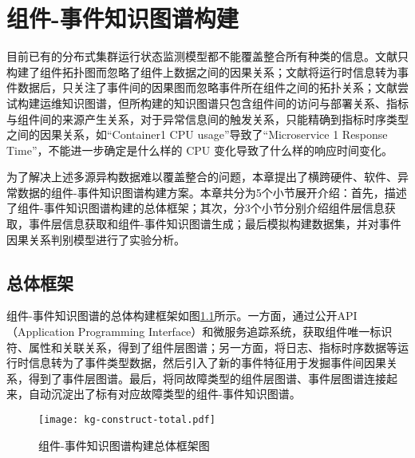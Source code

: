 \chapter{组件-事件知识图谱构建}
目前已有的分布式集群运行状态监测模型都不能覆盖整合所有种类的信息。文献\parencite{wang2019grano}只构建了组件拓扑图而忽略了组件上数据之间的因果关系；文献\parencite{nie2016mining-causality-graph}将运行时信息转为事件数据后，只关注了事件间的因果图而忽略事件所在组件之间的拓扑关系；文献\parencite{qiu2020causality-mining-knowledge-graph}尝试构建运维知识图谱，但所构建的知识图谱只包含组件间的访问与部署关系、指标与组件间的来源产生关系，对于异常信息间的触发关系，只能精确到指标时序类型之间的因果关系，如“Container1 CPU usage”导致了“Microservice 1 Response Time”，不能进一步确定是什么样的 CPU 变化导致了什么样的响应时间变化。

为了解决上述多源异构数据难以覆盖整合的问题，本章提出了横跨硬件、软件、异常数据的组件-事件知识图谱构建方案。本章共分为5个小节展开介绍：首先，描述了组件-事件知识图谱构建的总体框架；其次，分3个小节分别介绍组件层信息获取，事件层信息获取和组件-事件知识图谱生成；最后模拟构建数据集，并对事件因果关系判别模型进行了实验分析。

\section{总体框架}
组件-事件知识图谱的总体构建框架如图\ref{kg-construct-total}所示。一方面，通过公开API（Application Programming Interface）和微服务追踪系统，获取组件唯一标识符、属性和关联关系，得到了组件层图谱；另一方面，将日志、指标时序数据等运行时信息转为了事件类型数据，然后引入了新的事件特征用于发掘事件间因果关系，得到了事件层图谱。最后，将同故障类型的组件层图谱、事件层图谱连接起来，自动沉淀出了标有对应故障类型的组件-事件知识图谱。
\begin{figure}[htbp]
    \centering
    \texttt{[image: kg-construct-total.pdf]}
    \caption{组件-事件知识图谱构建总体框架图\label{kg-construct-total}}
\end{figure}
